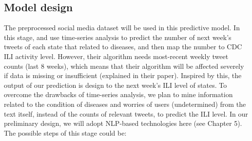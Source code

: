 \subsection{Model design}
\label{sec:First round predictor design}
The preprocessed social media dataset will be used in this predictive model. In this stage, \cite{elkin2017network} and \cite{serban2019real} use time-series analysis to predict the number of next week's tweets of each state that related to diseases, and then map the number to CDC ILI activity level. However, their algorithm needs most-recent weekly tweet counts (last 8 weeks), which means that their algorithm will be affected severely if data is missing or insufficient (explained in their paper). Inspired by this, the output of our prediction is design to the next week's ILI level of states. To overcome the drawbacks of time-series analysis, we plan to mine information related to the condition of diseases and worries of users (undetermined) from the text itself, instead of the counts of relevant tweets, to predict the ILI level. In our preliminary design, we will adopt NLP-based technologies here (see Chapter 5). The possible steps of this stage could be:
